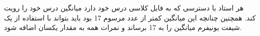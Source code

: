 هر استاد با دسترسی که به فایل کلاسی درس خود دارد میانگین درس خود را رویت کند. همچنین چنانچه این میانگین کمتر از عدد مرسوم 17 بود باید
بتواند با استفاده از یک شیفت یونیفرم میانگین را به 17 برساند و نمرات همه به مقدار یکسان اضافه شود.